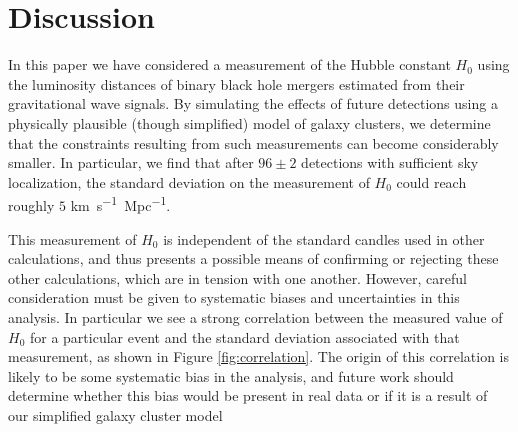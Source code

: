\section{Discussion} \label{sec:conclusions}

In this paper we have considered a measurement of the Hubble constant $H_0$ using the luminosity distances of binary black hole mergers estimated from their gravitational wave signals.
By simulating the effects of future detections using a physically plausible (though simplified) model of galaxy clusters, we determine that the constraints resulting from such measurements can become considerably smaller.
In particular, we find that after $96\pm 2$ detections with sufficient sky localization, the standard deviation on the measurement of $H_0$ could reach roughly $5$ \si{km.s^{-1}.Mpc^{-1}}.

This measurement of $H_0$ is independent of the standard candles used in other calculations, and thus presents a possible means of confirming or rejecting these other calculations, which are in tension with one another.
However, careful consideration must be given to systematic biases and uncertainties in this analysis.
In particular we see a strong correlation between the measured value of $H_0$ for a particular event and the standard deviation associated with that measurement, as shown in Figure \ref{fig:correlation}.
The origin of this correlation is likely to be some systematic bias in the analysis, and future work should determine whether this bias would be present in real data or if it is a result of our simplified galaxy cluster model




